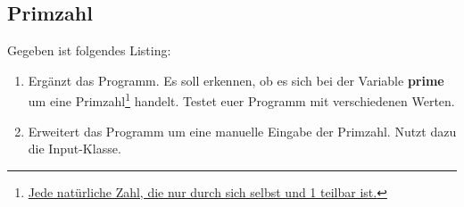 \subsection{Primzahl }
Gegeben ist folgendes Listing:
\begin{enumerate}
    \item Ergänzt das Programm. Es soll erkennen, ob es sich bei der Variable \textbf{prime} um eine Primzahl\footnote{\href{https://de.wikipedia.org/wiki/Primzahl}{Jede natürliche Zahl, die nur durch sich selbst und 1 teilbar ist.}} handelt. Testet euer Programm mit verschiedenen Werten.
    \item Erweitert das Programm um eine manuelle Eingabe der Primzahl. Nutzt dazu die Input-Klasse.
\end{enumerate}
